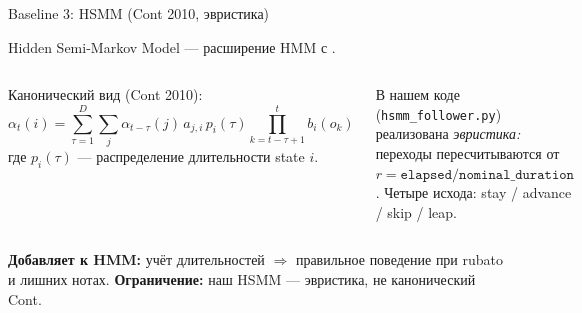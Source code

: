 ﻿%
\begin{frame}{Baseline 3: HSMM \small(Cont 2010, эвристика)}
  \footnotesize\setlength{\abovedisplayskip}{2pt}
  \setlength{\belowdisplayskip}{2pt}

  Hidden Semi-Markov Model --- расширение HMM с .

  \begin{columns}[T,onlytextwidth]
    Канонический вид (Cont 2010):
    \[
      \alpha_t(i) = \sum_{\tau=1}^{D}\sum_{j} \alpha_{t-\tau}(j)\,
        a_{j,i}\, p_i(\tau)\!\!\prod_{k=t-\tau+1}^{t}\!\! b_i(o_k)
    \]
    где $p_i(\tau)$ --- распределение длительности state $i$.

    \vspace{0.4em}
    В нашем коде (\texttt{hsmm\_follower.py}) реализована
    \emph{эвристика:} переходы пересчитываются от
    $r = \texttt{elapsed}/\texttt{nominal\_duration}$. Четыре исхода:
    stay / advance / skip / leap.

    \centering
    \resizebox{0.95\linewidth}{!}{%
    }
  \end{columns}

  \vspace{0.4em}
  {\footnotesize
   \textbf{Добавляет к HMM:} учёт длительностей $\Rightarrow$ правильное
   поведение при rubato и лишних нотах. \quad
   \textbf{Ограничение:} наш HSMM --- эвристика, не канонический Cont.}
\end{frame}
